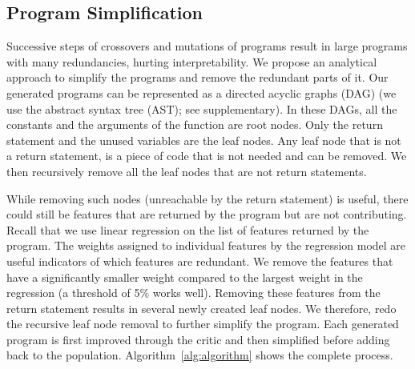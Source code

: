 \subsection{Program Simplification}\label{ssec:simplification}
Successive steps of crossovers and mutations of programs result in large programs with many redundancies, hurting interpretability.
We propose an analytical approach to simplify the programs and remove the redundant parts of it. 
Our generated programs can be represented as a directed acyclic graphs (DAG) (we use the abstract syntax tree (AST); see supplementary).
In these DAGs, all the constants and the arguments of the function are root nodes. 
Only the return statement and the unused variables are the leaf nodes.
Any leaf node that is not a return statement, is a piece of code that is not needed and can be removed. 
We then recursively remove all the leaf nodes that are not return statements.

While removing such nodes (unreachable by the return statement) is useful, there could still be features that are returned by the program but are not contributing. 
Recall that we use linear regression on the list of features returned by the program. The weights assigned to individual features by the regression model are useful indicators of which features are redundant.
We remove the features that have a significantly smaller weight compared to the largest weight in the regression (a threshold of 5\% works well). Removing these features from the return statement results in several newly created leaf nodes. We therefore, redo the recursive leaf node removal to further simplify the program. 
Each generated program is first improved through the critic and then simplified before adding back to the population. Algorithm~\ref{alg:algorithm} shows the complete process. 




